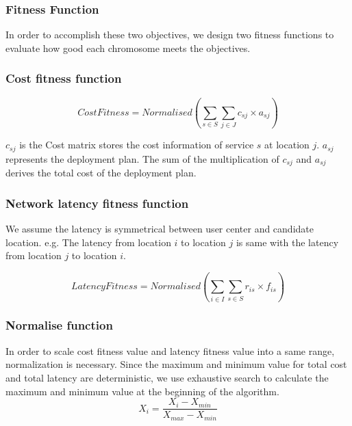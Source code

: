 \documentclass{llncs}
\begin{document}
\subsubsection{Fitness Function}

\begin{flushleft}In order to accomplish these two objectives, we design two fitness functions to evaluate 
how good each chromosome meets the objectives.\end{flushleft}
\subsubsection{Cost fitness function}

\begin{equation}
	CostFitness = Normalised(\sum\limits_{s \in S} \sum\limits_{j \in J} c_{sj} \times a_{sj})
\end{equation}

$c_{sj}$ is the Cost matrix stores the cost information of service $s$ at location $j$. $a_{sj}$ represents the deployment plan. The sum of the multiplication of 
$c_{sj}$ and $a_{sj}$ derives the total cost of the deployment plan.



\subsubsection{Network latency fitness function}
We assume the latency is symmetrical between user center and candidate location. e.g. 
The latency from location $i$ to location $j$ is same with the latency from location $j$ to location $i$.

	\begin{equation}
		LatencyFitness = Normalised(\sum\limits_{i \in I} \sum\limits_{s \in S} r_{is} \times f_{is})
	\end{equation}

\subsubsection{Normalise function}
In order to scale cost fitness value and latency fitness value into a same range, normalization is necessary.
Since the maximum and minimum value for total cost and total latency are deterministic, we use exhaustive search to
calculate the maximum and minimum value at the beginning of the algorithm.
	\begin{equation}
		X_{i} = \frac{X_{i} - X_{min}}{X_{max} - X_{min}}
	\end{equation}
\end{document}
